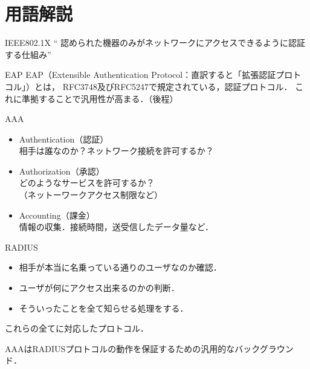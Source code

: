 \section{用語解説}
\begin{frame}[c]{\fft}
    \begin{block}{IEEE802.1X}
        `` 認められた機器のみがネットワークにアクセスできるように認証する仕組み''
    \end{block}
    \vfill
    \begin{block}{EAP}
        EAP（Extensible Authentication Protocol：直訳すると「拡張認証プロトコル」）とは，
        RFC3748及びRFC5247で規定されている，認証プロトコル．
        これに準拠することで汎用性が高まる．（後程）
    \end{block}
\end{frame}
\begin{frame}[c]{\fft}
    \begin{block}{AAA}
        \begin{itemize}
            \item {\large A}uthentication（認証）\\
                  相手は誰なのか？ネットワーク接続を許可するか？
            \item {\large A}uthorization（承認）\\
                  どのようなサービスを許可するか？\\（ネットーワークアクセス制限など）
            \item {\large A}ccounting（課金）\\
                  情報の収集．接続時間，送受信したデータ量など．
        \end{itemize}
    \end{block}
\end{frame}
\begin{frame}[c]{\fft}
    \begin{block}{RADIUS}
        \begin{itemize}
            \item 相手が本当に名乗っている通りのユーザなのか確認．
            \item ユーザが何にアクセス出来るのかの判断．
            \item そういったことを全て知らせる処理をする．
        \end{itemize}
        これらの全てに対応したプロトコル．\par
        AAAはRADIUSプロトコルの動作を保証するための汎用的なバックグラウンド．
    \end{block}
\end{frame}